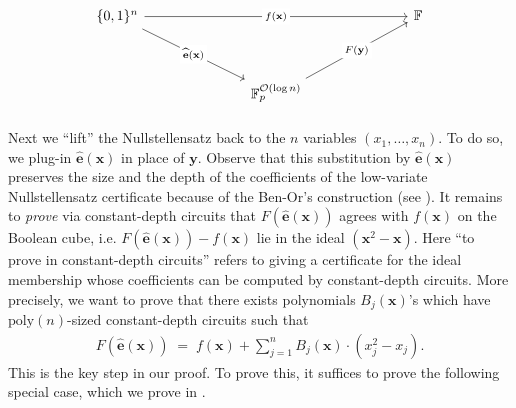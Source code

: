 \documentclass[11pt]{article}
\begin{document}
\[\begin{tikzcd}
	{\{0,1\}^{n}} &&&&&& {\mathbb{F}} \\
	\\
	&&& {\mathbb{F}_{p}^{\mathcal{O}(\log n)}}
	\arrow["{f(\mathbf{x})}"{description}, from=1-1, to=1-7]
	\arrow["{\widehat{\mathbf{e}}(\mathbf{x})}"{description}, from=1-1, to=3-4]
	\arrow["{F(\mathbf{y})}"{description}, from=3-4, to=1-7]
\end{tikzcd}\]



\paragraph{}Next we ``lift'' the Nullstellensatz back to the $n$ variables $(x_{1},\ldots,x_{n})$. To do so, we plug-in $\widehat{\mathbf{e}}(\mathbf{x})$ in place of $\mathbf{y}$. Observe that this substitution by $\widehat{\mathbf{e}}(\mathbf{x})$ preserves the size and the depth of the coefficients of the low-variate Nullstellensatz certificate because of the Ben-Or's construction (see ).\newline
It remains to \emph{prove} via constant-depth circuits that $F(\widehat{\mathbf{e}}(\mathbf{x}))$ agrees with $f(\mathbf{x})$ on the Boolean cube, i.e. $F(\widehat{\mathbf{e}}(\mathbf{x})) - f(\mathbf{x})$ lie in the ideal $(\mathbf{x}^{2} - \mathbf{x})$. Here ``to prove in constant-depth circuits'' refers to giving a certificate for the ideal membership whose coefficients can be computed by constant-depth circuits. More precisely, we want to prove that there exists polynomials $B_{j}(\mathbf{x})$'s which have $\mathrm{poly}(n)$-sized constant-depth circuits such that
\begin{align*}
    F(\widehat{\mathbf{e}}(\mathbf{x})) \; = \; f(\mathbf{x}) + \sum_{j=1}^{n} B_{j}(\mathbf{x}) \cdot (x_{j}^{2} - x_{j}).
\end{align*}
This is the key step in our proof. To prove this, it suffices to prove the following special case, which we prove in .

\end{document}
